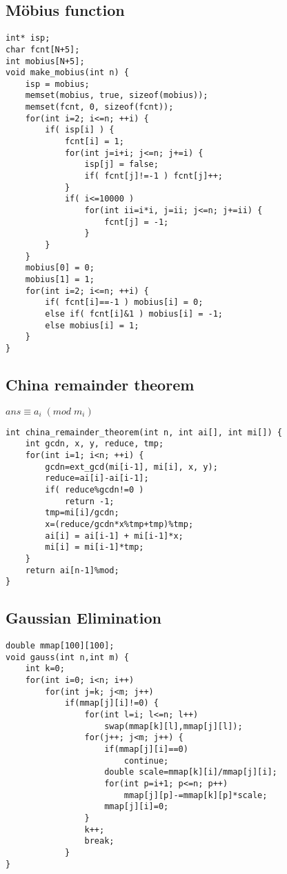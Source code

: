 \documentclass[11pt,twocolumn,a4paper]{article}
\begin{document}
\subsection{Möbius function}
\begin{lstlisting}[label=Möbius function]
int* isp;
char fcnt[N+5];
int mobius[N+5];
void make_mobius(int n) {
    isp = mobius;
    memset(mobius, true, sizeof(mobius));
    memset(fcnt, 0, sizeof(fcnt));
    for(int i=2; i<=n; ++i) {
        if( isp[i] ) {
            fcnt[i] = 1;
            for(int j=i+i; j<=n; j+=i) {
                isp[j] = false;
                if( fcnt[j]!=-1 ) fcnt[j]++;
            }
            if( i<=10000 )
                for(int ii=i*i, j=ii; j<=n; j+=ii) {
                    fcnt[j] = -1;
                }
        }
    }
    mobius[0] = 0;
    mobius[1] = 1;
    for(int i=2; i<=n; ++i) {
        if( fcnt[i]==-1 ) mobius[i] = 0;
        else if( fcnt[i]&1 ) mobius[i] = -1;
        else mobius[i] = 1;
    }
}
\end{lstlisting}

\subsection{China remainder theorem}
$ ans \equiv  a_i\; (mod\; m_i) $
\begin{lstlisting}[label=China remainder theorem]
int china_remainder_theorem(int n, int ai[], int mi[]) {
	int gcdn, x, y, reduce, tmp;
	for(int i=1; i<n; ++i) {
		gcdn=ext_gcd(mi[i-1], mi[i], x, y);
		reduce=ai[i]-ai[i-1];
		if( reduce%gcdn!=0 )
			return -1;
		tmp=mi[i]/gcdn;
		x=(reduce/gcdn*x%tmp+tmp)%tmp;
		ai[i] = ai[i-1] + mi[i-1]*x;
		mi[i] = mi[i-1]*tmp;
	}
	return ai[n-1]%mod;
}
\end{lstlisting}
\subsection{Gaussian Elimination}
\begin{lstlisting}[label=Gaussian Elimination]
double mmap[100][100];
void gauss(int n,int m) {
	int k=0;
	for(int i=0; i<n; i++)
		for(int j=k; j<m; j++)
			if(mmap[j][i]!=0) {
				for(int l=i; l<=n; l++)
					swap(mmap[k][l],mmap[j][l]);
				for(j++; j<m; j++) {
					if(mmap[j][i]==0)
						continue;
					double scale=mmap[k][i]/mmap[j][i];
					for(int p=i+1; p<=n; p++)
						mmap[j][p]-=mmap[k][p]*scale;
					mmap[j][i]=0;
				}
				k++;
				break;
			}
}
\end{lstlisting}

\end{document}
